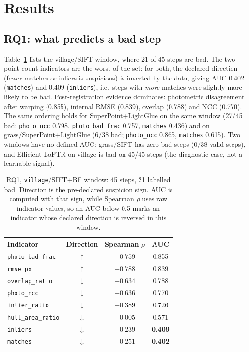 \documentclass[conference]{IEEEtran}
\begin{document}
\section{Results}
\subsection{RQ1: what predicts a bad step}
Table~\ref{tab:rq1} lists the village/SIFT window, where 21 of 45 steps are
bad. The two point-count indicators are the worst of the set: for both, the
declared direction (fewer matches or inliers is suspicious) is inverted by the
data, giving AUC 0.402 (\texttt{matches}) and 0.409 (\texttt{inliers}), i.e.\
steps with \emph{more} matches were slightly more likely to be bad.
Post-registration evidence dominates: photometric
disagreement after warping (0.855), internal RMSE (0.839), overlap (0.788) and
NCC (0.770). The same ordering holds for SuperPoint+LightGlue on the same
window (27/45 bad; \texttt{photo\_ncc} 0.798, \texttt{photo\_bad\_frac} 0.757,
\texttt{matches} 0.436) and on grass/SuperPoint+LightGlue (6/38 bad;
\texttt{photo\_ncc} 0.865, \texttt{matches} 0.615). Two windows have no
defined AUC: grass/SIFT has zero bad steps (0/38 valid steps), and
Efficient LoFTR on village is bad on 45/45 steps (the diagnostic case, not
a learnable signal).
\begin{table}[t]
\caption{RQ1, \texttt{village}/SIFT+BF window: 45 steps, 21 labelled bad.
Direction is the pre-declared suspicion sign. AUC is computed with that sign,
while Spearman $\rho$ uses raw indicator values, so an AUC below 0.5 marks an
indicator whose declared direction is reversed in this window.}\label{tab:rq1}
\centering\footnotesize
\setlength{\tabcolsep}{4pt}
\begin{tabular}{lccc}
\toprule
Indicator & Direction & Spearman $\rho$ & AUC \\
\midrule
\texttt{photo\_bad\_frac} & $\uparrow$ & $+0.759$ & 0.855 \\
\texttt{rmse\_px}         & $\uparrow$ & $+0.788$ & 0.839 \\
\texttt{overlap\_ratio}   & $\downarrow$ & $-0.634$ & 0.788 \\
\texttt{photo\_ncc}       & $\downarrow$ & $-0.636$ & 0.770 \\
\texttt{inlier\_ratio}    & $\downarrow$ & $-0.389$ & 0.726 \\
\texttt{hull\_area\_ratio}& $\downarrow$ & $+0.005$ & 0.571 \\
\texttt{inliers}          & $\downarrow$ & $+0.239$ & \textbf{0.409} \\
\texttt{matches}          & $\downarrow$ & $+0.251$ & \textbf{0.402} \\
\bottomrule
\end{tabular}
\end{table}
\end{document}
